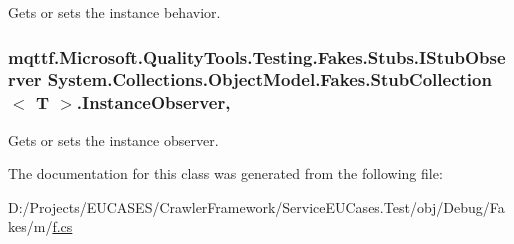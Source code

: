 Gets or sets the instance behavior.

\hypertarget{class_system_1_1_collections_1_1_object_model_1_1_fakes_1_1_stub_collection_3_01_t_01_4_a0707340cd26fe2b9fc059439f6b8c857}{
\subsubsection[{Instance\-Observer}]{\setlength{\rightskip}{0pt plus 5cm}mqttf.\-Microsoft.\-Quality\-Tools.\-Testing.\-Fakes.\-Stubs.\-I\-Stub\-Observer System.\-Collections.\-Object\-Model.\-Fakes.\-Stub\-Collection$<$ T $>$.Instance\-Observer\hspace{0.3cm}{\ttfamily [get]}, {\ttfamily [set]}}}\label{class_system_1_1_collections_1_1_object_model_1_1_fakes_1_1_stub_collection_3_01_t_01_4_a0707340cd26fe2b9fc059439f6b8c857}


Gets or sets the instance observer.



The documentation for this class was generated from the following file\-:\begin{DoxyCompactItemize}
\item 
D\-:/\-Projects/\-E\-U\-C\-A\-S\-E\-S/\-Crawler\-Framework/\-Service\-E\-U\-Cases.\-Test/obj/\-Debug/\-Fakes/m/\hyperlink{m_2f_8cs}{f.\-cs}\end{DoxyCompactItemize}
